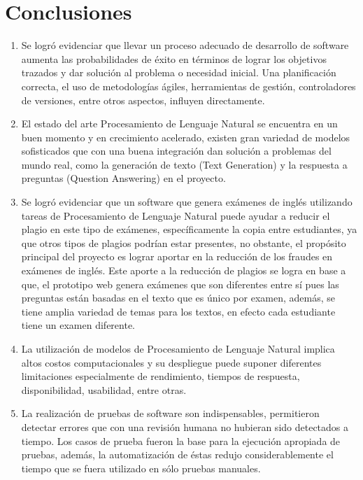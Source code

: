 \documentclass[../Main.tex]{subfiles}
\begin{document}
\section{Conclusiones}

    \begin{justify}
    
    \begin{enumerate}
        \item Se logró evidenciar que llevar un proceso adecuado de desarrollo de software aumenta las probabilidades de éxito en términos de lograr los objetivos trazados y dar solución al problema o necesidad inicial. Una planificación correcta, el uso de metodologías ágiles, herramientas de gestión, controladores de versiones, entre otros aspectos, influyen directamente.

        \item El estado del arte Procesamiento de Lenguaje Natural se encuentra en un buen momento y en crecimiento acelerado, existen gran variedad de modelos sofisticados que con una buena integración dan solución a problemas del mundo real, como la generación de texto (Text Generation) y la respuesta a preguntas (Question Answering) en el proyecto.
            
        \item Se logró evidenciar que un software que genera exámenes de inglés utilizando tareas de Procesamiento de Lenguaje Natural puede ayudar a reducir el plagio en este tipo de exámenes, específicamente la copia entre estudiantes, ya que otros tipos de plagios podrían estar presentes, no obstante, el propósito principal del proyecto es lograr aportar en la reducción de los fraudes en exámenes de inglés. Este aporte a la reducción de plagios se logra en base a que, el prototipo web genera exámenes que son diferentes entre sí pues las preguntas están basadas en el texto que es único por examen, además, se tiene amplia variedad de temas para los textos, en efecto cada estudiante tiene un examen diferente.
        
        \item La utilización de modelos de Procesamiento de Lenguaje Natural implica altos costos computacionales y su despliegue puede suponer diferentes limitaciones especialmente de rendimiento, tiempos de respuesta, disponibilidad, usabilidad, entre otras.
        
        \item La realización de pruebas de software son indispensables, permitieron detectar errores que con una revisión humana no hubieran sido detectados a tiempo. Los casos de prueba fueron la base para la ejecución apropiada de pruebas, además, la automatización de éstas redujo considerablemente el tiempo que se fuera utilizado en sólo pruebas manuales. 
        
    \end{enumerate}
    
    \end{justify}
\end{document}
